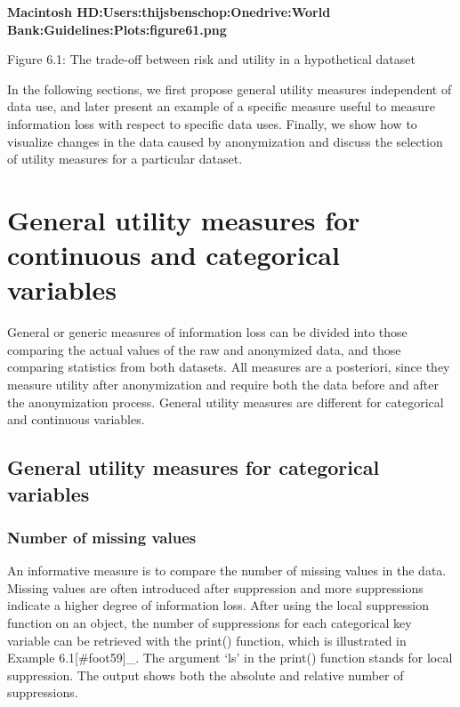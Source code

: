 \documentclass[letterpaper,10pt,english]{sphinxmanual}
\begin{document}
{\color{red}\bfseries{}\textbar{}Macintosh HD:Users:thijsbenschop:Onedrive:World
Bank:Guidelines:Plots:figure61.png\textbar{}}

Figure 6.1: The trade-off between risk and utility in a hypothetical
dataset

In the following sections, we first propose general utility measures
independent of data use, and later present an example of a specific
measure useful to measure information loss with respect to specific data
uses. Finally, we show how to visualize changes in the data caused by
anonymization and discuss the selection of utility measures for a
particular dataset.


\section{General utility measures for continuous and categorical variables}
\label{\detokenize{utility:general-utility-measures-for-continuous-and-categorical-variables}}
General or generic measures of information loss can be divided into
those comparing the actual values of the raw and anonymized data, and
those comparing statistics from both datasets. All measures are a
posteriori, since they measure utility after anonymization and require
both the data before and after the anonymization process. General
utility measures are different for categorical and continuous variables.


\subsection{General utility measures for categorical variables}
\label{\detokenize{utility:general-utility-measures-for-categorical-variables}}

\subsubsection{Number of missing values}
\label{\detokenize{utility:number-of-missing-values}}
An informative measure is to compare the number of missing values in the
data. Missing values are often introduced after suppression and more
suppressions indicate a higher degree of information loss. After using
the local suppression function on an  object, the number of
suppressions for each categorical key variable can be retrieved with the
print() function, which is illustrated in Example
6.1{[}\#foot59{]}\_. The argument ‘ls’ in the print() function
stands for local suppression. The output shows both the absolute and
relative number of suppressions.
\end{document}
